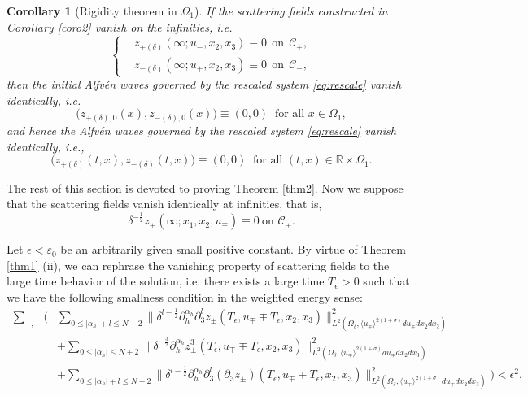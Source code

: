 \documentclass[10pt,reqno]{amsart}
\numberwithin{equation}{section}
\newtheorem{corollary}[theorem]{Corollary}
\begin{document}
 \begin{corollary}[Rigidity theorem in $\Omega_1$]\label{coro3}
 	If the scattering fields constructed in Corollary \ref{coro2} 
 	vanish on the infinities, i.e.
 	\[\begin{cases}
 		&z_{+(\delta)}(\infty;u_-,x_2,x_3)\equiv 0 \ \ \text{on} \ \ \mathcal{C}_+,\\
 		&z_{-(\delta)}(\infty;u_+,x_2,x_3)\equiv 0 \ \ \text{on} \ \ \mathcal{C}_-,
 	\end{cases}
 	\]
 	then the initial Alfv\'en waves governed by the rescaled system  \eqref{eq:rescale} vanish identically, i.e.  \[\big(z_{+(\delta),0}(x),z_{-(\delta),0}(x)\big)\equiv(0,0)\ \text{ for all }x\in\Omega_1,\] and hence
 	the Alfv\'en waves governed by the rescaled system  \eqref{eq:rescale}  vanish identically, i.e.,  \[\big(z_{+(\delta)}(t,x),z_{-(\delta)}(t,x)\big)\equiv(0,0)\  \text{ for all }(t,x)\in \mathbb{R}\times \Omega_1.\] 
 \end{corollary}
 
The rest of this section is devoted to proving Theorem \ref{thm2}.
Now we suppose that the scattering fields 
	vanish identically at infinities, that is,
	\[\delta^{-\frac{1}{2}}z_\pm(\infty;x_1,x_2,u_\mp)\equiv 0\  \text{on $\mathcal{C}_\pm$.}\]
	
	Let $\epsilon<\varepsilon_0$ be an arbitrarily given small positive constant. By virtue of Theorem \ref{thm1} (ii), we can rephrase the vanishing property of scattering fields to the large time behavior of the solution, i.e.  there exists a large time $T_\epsilon>0$ such that we have the following smallness condition in the weighted energy sense:
	\begin{align*}
		\sum_{+,-}\bigg(&\sum_{0\leqslant|\alpha_h|+l\leqslant N+2}\Big\|\delta^{l-\frac{1}{2}}\partial_h^{\alpha_h}\partial_3^lz_{\pm}(T_\epsilon,u_\mp\mp T_\epsilon,x_2,x_3)\Big\|_{L^2(\Omega_{\delta},\langle u_\mp\rangle^{2(1+\sigma)}du_\mp dx_2dx_3)}^2\\
		&+\sum_{0\leqslant|\alpha_h|\leqslant N+2}\Big\|\delta^{-\frac{3}{2}}\partial_h^{\alpha_h}z^3_{\pm}(T_\epsilon,u_\mp\mp T_\epsilon,x_2,x_3)\Big\|_{L^2(\Omega_{\delta},\langle u_\mp\rangle^{2(1+\sigma)}du_\mp dx_2dx_3)}^2\\
		&+\sum_{0\leqslant|\alpha_h|+l\leqslant N+2}\Big\|\delta^{l-\frac{1}{2}}\partial_h^{\alpha_h}\partial_3^l(\partial_3z_{\pm})(T_\epsilon,u_\mp\mp T_\epsilon,x_2,x_3)\Big\|_{L^2(\Omega_{\delta},\langle u_\mp\rangle^{2(1+\sigma)}du_\mp dx_2dx_3)}^2\bigg)<\epsilon^2.
	\end{align*}
\end{document}
